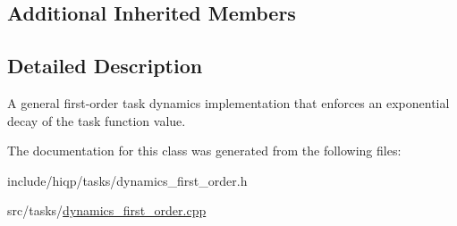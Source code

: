 \subsection*{Additional Inherited Members}


\subsection{Detailed Description}
A general first-\/order task dynamics implementation that enforces an exponential decay of the task function value. 

The documentation for this class was generated from the following files\-:\begin{DoxyCompactItemize}
\item 
include/hiqp/tasks/dynamics\-\_\-first\-\_\-order.\-h\item 
src/tasks/\hyperlink{dynamics__first__order_8cpp}{dynamics\-\_\-first\-\_\-order.\-cpp}\end{DoxyCompactItemize}
